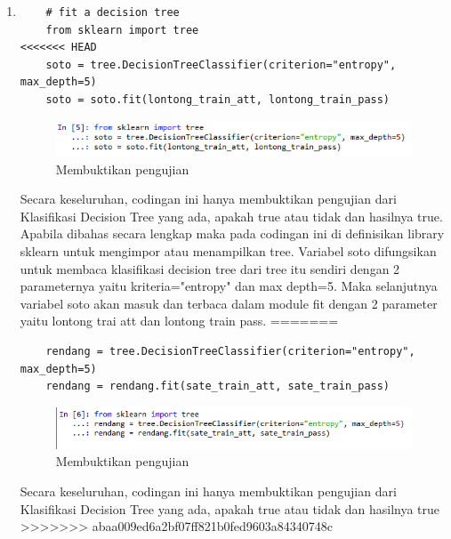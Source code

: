 \begin{enumerate}
\item 
\begin{verbatim}
	# fit a decision tree
	from sklearn import tree
<<<<<<< HEAD
	soto = tree.DecisionTreeClassifier(criterion="entropy", max_depth=5)
	soto = soto.fit(lontong_train_att, lontong_train_pass)
\end{verbatim}
\begin{figure}[ht]
\centering
\includegraphics[scale=0.9]{figures/lontong/5.png}
\caption{Membuktikan pengujian}
\end{figure}
\par
	Secara keseluruhan, codingan ini hanya membuktikan pengujian dari Klasifikasi Decision Tree yang ada, apakah true atau tidak dan hasilnya true. Apabila dibahas secara lengkap maka pada codingan ini di definisikan library sklearn untuk mengimpor atau menampilkan tree. Variabel soto difungsikan untuk membaca klasifikasi decision tree dari tree itu sendiri dengan 2 parameternya yaitu kriteria="entropy" dan max depth=5. Maka selanjutnya variabel soto akan masuk dan terbaca dalam module fit dengan 2 parameter yaitu lontong trai att dan lontong train pass.
=======
\begin{verbatim}
	rendang = tree.DecisionTreeClassifier(criterion="entropy", max_depth=5)
	rendang = rendang.fit(sate_train_att, sate_train_pass)
\end{verbatim}
\begin{figure}[ht]
\centering
\includegraphics[scale=0.9]{figures/44.png}
\caption{Membuktikan pengujian}
\end{figure}
\par
	Secara keseluruhan, codingan ini hanya membuktikan pengujian dari Klasifikasi Decision Tree yang ada, apakah true atau tidak dan hasilnya true
>>>>>>> abaa009ed6a2bf07ff821b0fed9603a84340748c


\end{enumerate}
